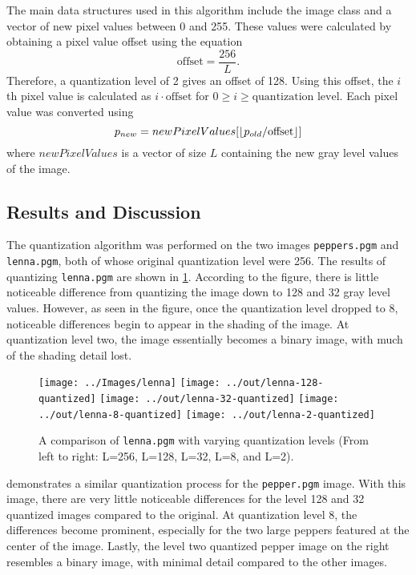 \documentclass[headings=optiontoheadandtoc,listof=totoc,parskip=full]{scrartcl}
\DeclarePairedDelimiter\floor{\lfloor}{\rfloor}
\begin{document}
The main data structures used in this algorithm include the image class and a vector of new pixel values between 0 and 255. These values were calculated by obtaining a pixel value offset using the equation \[\text{offset} = \frac{256}{L}.\] Therefore, a quantization level of 2 gives an offset of 128. Using this offset, the $i$th pixel value is calculated as $i \cdot \text{offset}$ for $0 \geq i \geq \text{quantization level}$. Each pixel value was converted using \[
	p_{new} = newPixelValues[ \floor{p_{old} / \text{offset}} ]
\] where $newPixelValues$ is a vector of size $L$ containing the new gray level values of the image.

\subsection{Results and Discussion}

The quantization algorithm was performed on the two images \texttt{peppers.pgm} and \texttt{lenna.pgm}, both of whose original quantization level were 256. The results of quantizing \texttt{lenna.pgm} are shown in \cref{fig:quantize-result-1}. According to the figure, there is little noticeable difference from quantizing the image down to 128 and 32 gray level values. However, as seen in the figure, once the quantization level dropped to 8, noticeable differences begin to appear in the shading of the image. At quantization level two, the image essentially becomes a binary image, with much of the shading detail lost.

\begin{figure}[ht]
	\centering
	\texttt{[image: ../Images/lenna]}
	\texttt{[image: ../out/lenna-128-quantized]}
	\texttt{[image: ../out/lenna-32-quantized]}
	\texttt{[image: ../out/lenna-8-quantized]}
	\texttt{[image: ../out/lenna-2-quantized]}
	\caption{A comparison of \texttt{lenna.pgm} with varying quantization levels (From left to right: L=256, L=128, L=32, L=8, and L=2).}
	\label{fig:quantize-result-1}
\end{figure}

 demonstrates a similar quantization process for the \texttt{pepper.pgm} image. With this image, there are very little noticeable differences for the level 128 and 32 quantized images compared to the original. At quantization level 8, the differences become prominent, especially for the two large peppers featured at the center of the image. Lastly, the level two quantized pepper image on the right resembles a binary image, with minimal detail compared to the other images.
\end{document}
